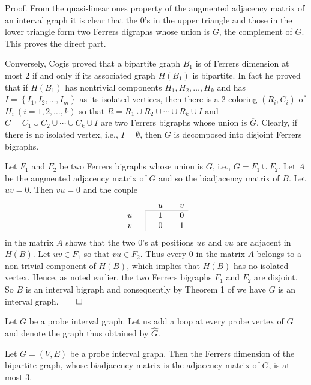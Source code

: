 \documentclass[secthm]{elsart}
\newcommand{\set}[1]{\left\{#1\right\}}
\begin{document}
\begin{pf*}{Proof.}
From the quasi-linear ones property of the augmented adjacency matrix of an interval graph it is clear that the $0$'s in the upper triangle and those in the lower triangle form two Ferrers digraphs whose union is $\overline{G}$, the complement of $G$. This proves the direct part.

Conversely, Cogis \cite{C} proved that a bipartite graph $B_1$ is of Ferrers dimension at most $2$ if and only if its associated graph $H(B_1)$ is bipartite. In fact he proved that if $H(B_1)$ has nontrivial components $H_1, H_2,\ldots ,H_k$ and has $I=\set{I_1,I_2,\ldots ,I_m}$ as its isolated vertices, then there is a $2$-coloring $(R_i,C_i)$ of $H_i\ (i=1,2,\ldots ,k)$ so that $R=R_1\cup R_2\cup\cdots\cup R_k\cup I$ and $C=C_1\cup C_2\cup\cdots\cup C_k\cup I$ are two Ferrers bigraphs whose union is $\overline{G}$. Clearly, if there is no isolated vertex, i.e., $I=\emptyset$, then $\overline{G}$ is decomposed into disjoint Ferrers bigraphs. 

Let $F_1$ and $F_2$ be two Ferrers bigraphs whose union is $\overline{G}$, i.e., $\overline{G}=F_1\cup F_2$. Let $A$ be the augmented adjacency matrix of $G$ and so the biadjacency matrix of $B$. Let $uv=0$. Then $vu=0$ and the couple
$$\begin{array}{cc|cccc}
\multicolumn{3}{c}{} & u && v\\ \cline{3-6}
u &&& 1 && 0 \\
v &&& 0 && 1 \\
\end{array}$$
in the matrix $A$ shows that the two $0$'s at positions $uv$ and $vu$ are adjacent in $H(B)$. Let $uv\in F_1$ so that $vu\in F_2$. Thus every $0$ in the matrix $A$ belongs to a non-trivial component of $H(B)$, which implies that $H(B)$ has no isolated vertex. Hence, as noted earlier, the two Ferrers bigraphs $F_1$ and $F_2$ are disjoint. So $B$ is an interval bigraph and consequently by Theorem 1 of \cite{SSW} we have $G$ is an interval graph.\hfill $\qed$
\end{pf*}

Let $G$ be a probe interval graph. Let us add a loop at every probe vertex of $G$ and denote the graph thus obtained by $\widehat{G}$.

\begin{cor}
Let $G=(V,E)$ be a probe interval graph. Then the Ferrers dimension of the bipartite graph, whose biadjacency matrix is the adjacency matrix of $\widehat{G}$, is at most $3$.
\end{cor}
\end{document}
